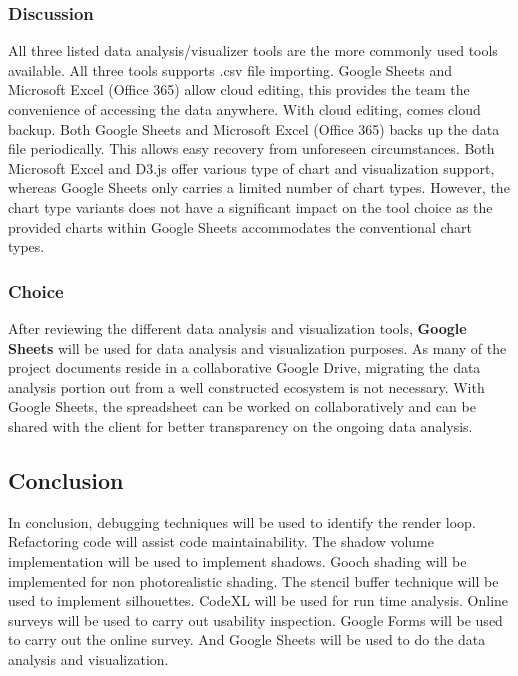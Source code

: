 \documentclass[10pt,journal,compsoc,draftclsnofoot]{IEEEtran}
\begin{document}
\subsubsection{Discussion}
All three listed data analysis/visualizer tools are the more commonly used tools available.
All three tools supports .csv file importing.
Google Sheets and Microsoft Excel (Office 365) allow cloud editing, this provides the team the convenience of accessing the data anywhere.
With cloud editing, comes cloud backup.
Both Google Sheets and Microsoft Excel (Office 365) backs up the data file periodically.
This allows easy recovery from unforeseen circumstances.
Both Microsoft Excel and D3.js offer various type of chart and visualization support, whereas Google Sheets only carries a limited number of chart types.
However, the chart type variants does not have a significant impact on the tool choice as the provided charts within Google Sheets accommodates the conventional chart types.

\subsubsection{Choice}
After reviewing the different data analysis and visualization tools, \textbf{Google Sheets} will be used for data analysis and visualization purposes.
As many of the project documents reside in a collaborative Google Drive, migrating the data analysis portion out from a well constructed ecosystem is not necessary.
With Google Sheets, the spreadsheet can be worked on collaboratively and can be shared with the client for better transparency on the ongoing data analysis. 

\newpage

\subsection{Conclusion}
In conclusion, debugging techniques will be used to identify the render loop.
Refactoring code will assist code maintainability.
The shadow volume implementation will be used to implement shadows.
Gooch shading will be implemented for non photorealistic shading.
The stencil buffer technique will be used to implement silhouettes.
CodeXL will be used for run time analysis.
Online surveys will be used to carry out usability inspection.
Google Forms will be used to carry out the online survey.
And Google Sheets will be used to do the data analysis and visualization.



\end{document}
